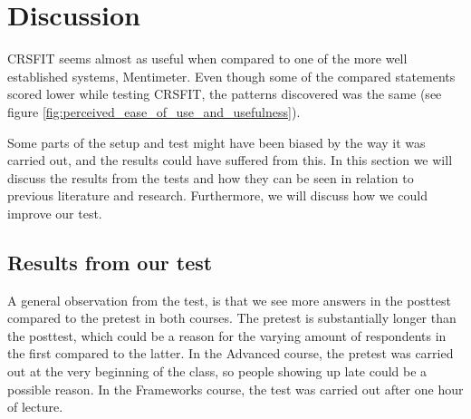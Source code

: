 \section{Discussion}





CRSFIT seems almost as useful when compared to one of the more well established systems, Mentimeter. Even though some of the compared statements scored lower while testing CRSFIT, the patterns discovered was the same (see figure \ref{fig:perceived_ease_of_use_and_usefulness}).


Some parts of the setup and test might have been biased by the way it was carried out, and the results could have suffered from this. In this section we will discuss the results from the tests and how they can be seen in relation to previous literature and research. Furthermore, we will discuss how we could improve our test.





\subsection{Results from our test}

A general observation from the test, is that we see more answers in the posttest compared to the pretest in both courses. The pretest is substantially longer than the posttest, which could be a reason for the varying amount of respondents in the first compared to the latter. In the Advanced course, the pretest was carried out at the very beginning of the class, so people showing up late could be a possible reason. In the Frameworks course, the test was carried out after one hour of lecture.



